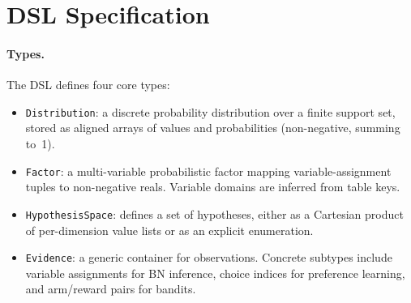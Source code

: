 \documentclass{article}
\begin{document}
\section{DSL Specification}
\label{app:dsl}

\paragraph{Types.}
The DSL defines four core types:
\begin{itemize}
    \item \texttt{Distribution}: a discrete probability distribution over a finite support set, stored as aligned arrays of values and probabilities (non-negative, summing to~1).
    \item \texttt{Factor}: a multi-variable probabilistic factor mapping variable-assignment tuples to non-negative reals. Variable domains are inferred from table keys.
    \item \texttt{HypothesisSpace}: defines a set of hypotheses, either as a Cartesian product of per-dimension value lists or as an explicit enumeration.
    \item \texttt{Evidence}: a generic container for observations. Concrete subtypes include variable assignments for BN inference, choice indices for preference learning, and arm/reward pairs for bandits.
\end{itemize}
\end{document}
